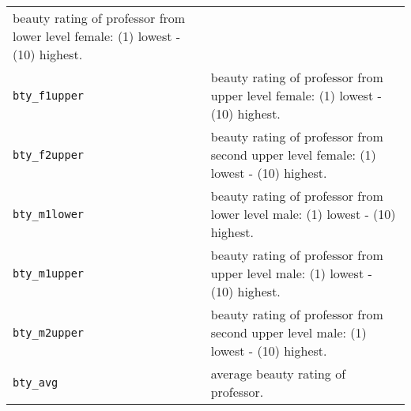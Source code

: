 \documentclass[
]{article}
\begin{document}
\begin{longtable}[]{@{}ll@{}}
\begin{minipage}[t]{0.38\columnwidth}
beauty rating of professor from lower level female: (1) lowest - (10)
highest.\strut
\end{minipage}\tabularnewline
\begin{minipage}[t]{0.56\columnwidth}\raggedright
\texttt{bty\_f1upper}\strut
\end{minipage} & \begin{minipage}[t]{0.38\columnwidth}\raggedright
beauty rating of professor from upper level female: (1) lowest - (10)
highest.\strut
\end{minipage}\tabularnewline
\begin{minipage}[t]{0.56\columnwidth}\raggedright
\texttt{bty\_f2upper}\strut
\end{minipage} & \begin{minipage}[t]{0.38\columnwidth}\raggedright
beauty rating of professor from second upper level female: (1) lowest -
(10) highest.\strut
\end{minipage}\tabularnewline
\begin{minipage}[t]{0.56\columnwidth}\raggedright
\texttt{bty\_m1lower}\strut
\end{minipage} & \begin{minipage}[t]{0.38\columnwidth}\raggedright
beauty rating of professor from lower level male: (1) lowest - (10)
highest.\strut
\end{minipage}\tabularnewline
\begin{minipage}[t]{0.56\columnwidth}\raggedright
\texttt{bty\_m1upper}\strut
\end{minipage} & \begin{minipage}[t]{0.38\columnwidth}\raggedright
beauty rating of professor from upper level male: (1) lowest - (10)
highest.\strut
\end{minipage}\tabularnewline
\begin{minipage}[t]{0.56\columnwidth}\raggedright
\texttt{bty\_m2upper}\strut
\end{minipage} & \begin{minipage}[t]{0.38\columnwidth}\raggedright
beauty rating of professor from second upper level male: (1) lowest -
(10) highest.\strut
\end{minipage}\tabularnewline
\begin{minipage}[t]{0.56\columnwidth}\raggedright
\texttt{bty\_avg}\strut
\end{minipage} & \begin{minipage}[t]{0.38\columnwidth}\raggedright
average beauty rating of professor.\strut
\end{minipage}\tabularnewline

\end{longtable}
\end{document}
